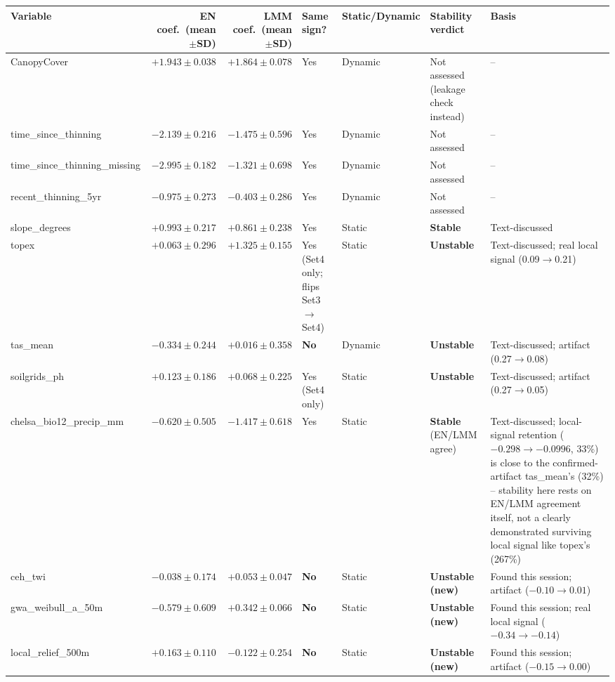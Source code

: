 \begin{table}[!htbp]
\centering
\scriptsize
\setlength{\tabcolsep}{3pt}
\renewcommand{\arraystretch}{1.05}
\begin{tabular}{lrrllll}
\toprule
Variable & EN coef.\ (mean$\pm$SD) & LMM coef.\ (mean$\pm$SD) & Same sign? & Static/Dynamic & Stability verdict & Basis \\
\midrule
CanopyCover & $+1.943\pm0.038$ & $+1.864\pm0.078$ & Yes & Dynamic & Not assessed (leakage check instead) & -- \\
time\_since\_thinning & $-2.139\pm0.216$ & $-1.475\pm0.596$ & Yes & Dynamic & Not assessed & -- \\
time\_since\_thinning\_missing & $-2.995\pm0.182$ & $-1.321\pm0.698$ & Yes & Dynamic & Not assessed & -- \\
recent\_thinning\_5yr & $-0.975\pm0.273$ & $-0.403\pm0.286$ & Yes & Dynamic & Not assessed & -- \\
slope\_degrees & $+0.993\pm0.217$ & $+0.861\pm0.238$ & Yes & Static & \textbf{Stable} & Text-discussed \\
topex & $+0.063\pm0.296$ & $+1.325\pm0.155$ & Yes (Set4 only; flips Set3$\to$Set4) & Static & \textbf{Unstable} & Text-discussed; real local signal (0.09$\to$0.21) \\
tas\_mean & $-0.334\pm0.244$ & $+0.016\pm0.358$ & \textbf{No} & Dynamic & \textbf{Unstable} & Text-discussed; artifact (0.27$\to$0.08) \\
soilgrids\_ph & $+0.123\pm0.186$ & $+0.068\pm0.225$ & Yes (Set4 only) & Static & \textbf{Unstable} & Text-discussed; artifact (0.27$\to$0.05) \\
chelsa\_bio12\_precip\_mm & $-0.620\pm0.505$ & $-1.417\pm0.618$ & Yes & Static & \textbf{Stable} (EN/LMM agree) & Text-discussed; local-signal retention ($-0.298\to-0.0996$, 33\%) is close to the confirmed-artifact tas\_mean's (32\%) -- stability here rests on EN/LMM agreement itself, not a clearly demonstrated surviving local signal like topex's (267\%) \\
ceh\_twi & $-0.038\pm0.174$ & $+0.053\pm0.047$ & \textbf{No} & Static & \textbf{Unstable (new)} & Found this session; artifact ($-0.10\to0.01$) \\
gwa\_weibull\_a\_50m & $-0.579\pm0.609$ & $+0.342\pm0.066$ & \textbf{No} & Static & \textbf{Unstable (new)} & Found this session; real local signal ($-0.34\to-0.14$) \\
local\_relief\_500m & $+0.163\pm0.110$ & $-0.122\pm0.254$ & \textbf{No} & Static & \textbf{Unstable (new)} & Found this session; artifact ($-0.15\to0.00$) \\

\end{tabular}
\end{table}
